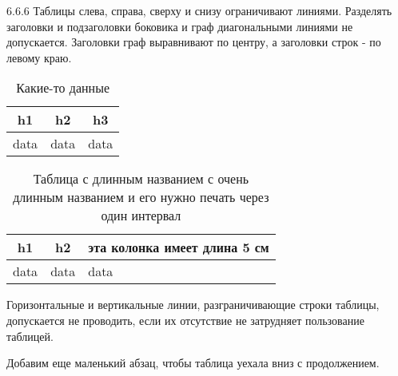 6.6.6 Таблицы слева, справа, сверху и снизу ограничивают линиями. Разделять
заголовки и подзаголовки боковика и граф диагональными линиями не допускается.
Заголовки граф выравнивают по центру, а заголовки строк - по левому краю.

\begin{table}[h]
    \caption{Какие-то данные}\label{tab:t1}
    \begin{tabular}{|c|c|c|}

        \hline
        h1 & h2 & h3 \\
        \hline
        data & data & data \\
        \hline

    \end{tabular}
\end{table}

\begin{table}[h]
    \caption{Таблица с длинным названием с очень длинным названием и его нужно %
              печать через один интервал}\label{tab:t2}
    \begin{tabular}{|c|c|m{5cm}|}\hline

        h1 & h2 & эта колонка имеет длина 5 см \\\hline
        data & data & data \\\hline

    \end{tabular}
\end{table}

Горизонтальные и вертикальные линии, разграничивающие строки таблицы,
допускается не проводить, если их отсутствие не затрудняет пользование
таблицей.

Добавим еще маленький абзац, чтобы таблица уехала вниз с продолжением.


